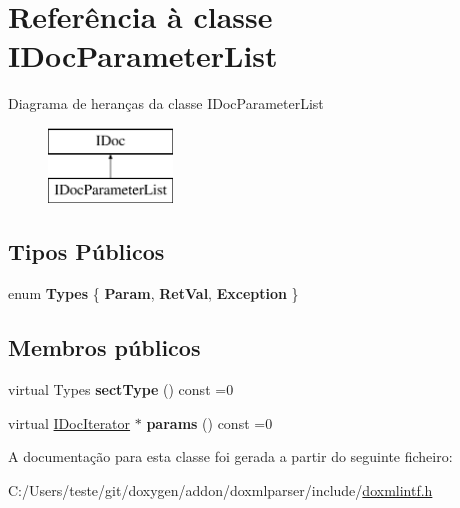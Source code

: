 \hypertarget{class_i_doc_parameter_list}{\section{Referência à classe I\-Doc\-Parameter\-List}
\label{class_i_doc_parameter_list}
}
Diagrama de heranças da classe I\-Doc\-Parameter\-List\begin{figure}[H]
\begin{center}
\leavevmode
\includegraphics[height=2.000000cm]{class_i_doc_parameter_list}
\end{center}
\end{figure}
\subsection*{Tipos Públicos}
\begin{DoxyCompactItemize}
\item 
enum {\bfseries Types} \{ {\bfseries Param}, 
{\bfseries Ret\-Val}, 
{\bfseries Exception}
 \}
\end{DoxyCompactItemize}
\subsection*{Membros públicos}
\begin{DoxyCompactItemize}
\item 
\hypertarget{class_i_doc_parameter_list_a9e39fa1a6cb0a5f53d870eb6956595e5}{virtual Types {\bfseries sect\-Type} () const =0}\label{class_i_doc_parameter_list_a9e39fa1a6cb0a5f53d870eb6956595e5}

\item 
\hypertarget{class_i_doc_parameter_list_af57c3bd57e740fc2022d7c642dbea1ed}{virtual \hyperlink{class_i_doc_iterator}{I\-Doc\-Iterator} $\ast$ {\bfseries params} () const =0}\label{class_i_doc_parameter_list_af57c3bd57e740fc2022d7c642dbea1ed}

\end{DoxyCompactItemize}


A documentação para esta classe foi gerada a partir do seguinte ficheiro\-:\begin{DoxyCompactItemize}
\item 
C\-:/\-Users/teste/git/doxygen/addon/doxmlparser/include/\hyperlink{include_2doxmlintf_8h}{doxmlintf.\-h}\end{DoxyCompactItemize}
